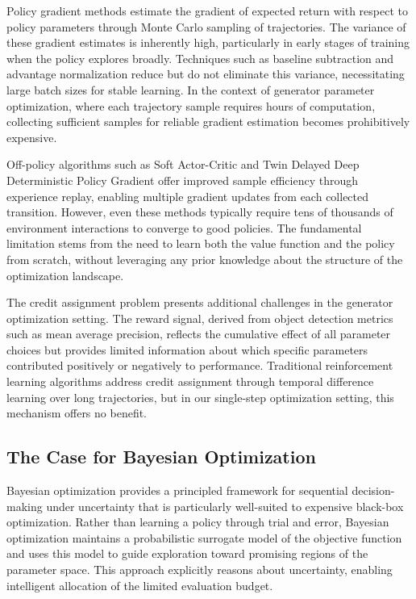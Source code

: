 Policy gradient methods estimate the gradient of expected return with respect to policy parameters through Monte Carlo sampling of trajectories. The variance of these gradient estimates is inherently high, particularly in early stages of training when the policy explores broadly. Techniques such as baseline subtraction and advantage normalization reduce but do not eliminate this variance, necessitating large batch sizes for stable learning. In the context of generator parameter optimization, where each trajectory sample requires hours of computation, collecting sufficient samples for reliable gradient estimation becomes prohibitively expensive.

Off-policy algorithms such as Soft Actor-Critic and Twin Delayed Deep Deterministic Policy Gradient offer improved sample efficiency through experience replay, enabling multiple gradient updates from each collected transition. However, even these methods typically require tens of thousands of environment interactions to converge to good policies. The fundamental limitation stems from the need to learn both the value function and the policy from scratch, without leveraging any prior knowledge about the structure of the optimization landscape.

The credit assignment problem presents additional challenges in the generator optimization setting. The reward signal, derived from object detection metrics such as mean average precision, reflects the cumulative effect of all parameter choices but provides limited information about which specific parameters contributed positively or negatively to performance. Traditional reinforcement learning algorithms address credit assignment through temporal difference learning over long trajectories, but in our single-step optimization setting, this mechanism offers no benefit.

\subsection{The Case for Bayesian Optimization}
\label{subsec:bayesian_case}

Bayesian optimization provides a principled framework for sequential decision-making under uncertainty that is particularly well-suited to expensive black-box optimization. Rather than learning a policy through trial and error, Bayesian optimization maintains a probabilistic surrogate model of the objective function and uses this model to guide exploration toward promising regions of the parameter space. This approach explicitly reasons about uncertainty, enabling intelligent allocation of the limited evaluation budget.

